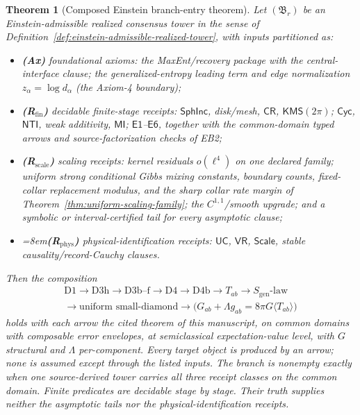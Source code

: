 \documentclass[11pt]{article}
\newtheorem{theorem}{Theorem}[section]
\begin{document}
\begin{theorem}[Composed Einstein branch-entry theorem]
\label{thm:einstein-branch-entry-composed}
Let \((\mathfrak B_r)\) be an Einstein-admissible realized consensus tower in
the sense of Definition~\ref{def:einstein-admissible-realized-tower}, with
inputs partitioned as:
\begin{itemize}[leftmargin=2em]
\item \textbf{(Ax)} foundational axioms: the MaxEnt/recovery package with
the central-interface clause; the generalized-entropy leading term and edge
normalization \(z_\alpha=\log d_\alpha\) (the Axiom-4 boundary);
\item \textbf{(R\(_{\mathrm{fin}}\))} decidable finite-stage receipts:
\(\mathsf{SphInc}\), disk/mesh, \(\mathsf{CR}\),
\(\mathsf{KMS}(2\pi)\); \(\mathsf{Cyc}\), \(\mathsf{NTI}\), weak additivity,
\(\mathsf{MI}\); \(\mathsf{E1}\)--\(\mathsf{E6}\), together with the
common-domain typed arrows and source-factorization checks of EB2;
\item \textbf{(R\(_{\mathrm{scale}}\))} scaling receipts: kernel residuals
\(o(\ell^4)\) on one declared family; uniform strong conditional Gibbs
mixing constants, boundary counts, fixed-collar replacement modulus, and the
sharp collar rate margin of Theorem~\ref{thm:uniform-scaling-family}; the
\(C^{1,1}\)/smooth upgrade; and a symbolic or interval-certified tail for
every asymptotic clause;
\item {\emergencystretch=8em\relax \textbf{(R\(_{\mathrm{phys}}\))} physical-identification receipts:
\(\mathsf{UC}\), \(\mathsf{VR}\), \(\mathsf{Scale}\), stable
causality/record-Cauchy clauses.\par}
\end{itemize}
Then the composition
\[
\begin{gathered}
\text{D1}\to\text{D3h}\to\text{D3b--f}\to\text{D4}\to\text{D4b}
\to T_{ab}\to S_{\mathrm{gen}}\text{-law}\\
\to\text{uniform small-diamond}\to
\bigl(G_{ab}+\Lambda g_{ab}=8\pi G\langle T_{ab}\rangle\bigr)
\end{gathered}
\]
holds with each arrow the cited theorem of this manuscript, on common
domains with composable error envelopes, at semiclassical
expectation-value level, with \(G\) structural and \(\Lambda\) per-component.
Every target object is produced by an arrow; none is assumed except through
the listed inputs. The branch is \emph{nonempty} exactly when one
source-derived tower carries all three receipt classes on the common domain.
Finite predicates are decidable stage by stage. Their truth supplies neither
the asymptotic tails nor the physical-identification receipts.
\end{theorem}
\end{document}
